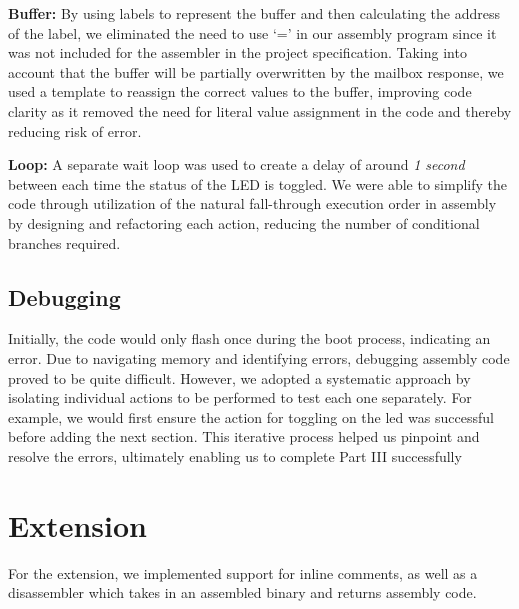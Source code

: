 \documentclass{article}
\begin{document}
\begin{adjustwidth}{2em}{0pt}
            \textbf{Buffer: }By using labels to represent the buffer and then calculating the address of the label, we eliminated the need to use ‘=’ in our assembly program since it was not included for the assembler in the project specification. Taking into account that the buffer will be partially overwritten by the mailbox response, we used a template to reassign the correct values to the buffer, improving code clarity as it removed the need for literal value assignment in the code and thereby reducing risk of error.
            
            \textbf{Loop: }A separate wait loop was used to create a delay of around \textit{1 second} between each time the status of the LED is toggled. We were able to simplify the code through utilization of the natural fall-through execution order in assembly by designing and refactoring each action, reducing the number of conditional branches required.
    
      
        
        \subsection{Debugging}
    
            Initially, the code would only flash once during the boot process, indicating an error. Due to navigating memory and identifying errors, debugging assembly code proved to be quite difficult. However, we adopted a systematic approach by isolating individual actions to be performed to test each one separately. For example, we would first ensure the action for toggling on the led was successful before adding the next section. This iterative process helped us pinpoint and resolve the errors, ultimately enabling us to complete Part III successfully
        
        \end{adjustwidth}
    
    \section{Extension}

        For the extension, we implemented support for inline comments, as well as a disassembler which takes in an assembled binary and returns assembly code.
        
\end{document}
